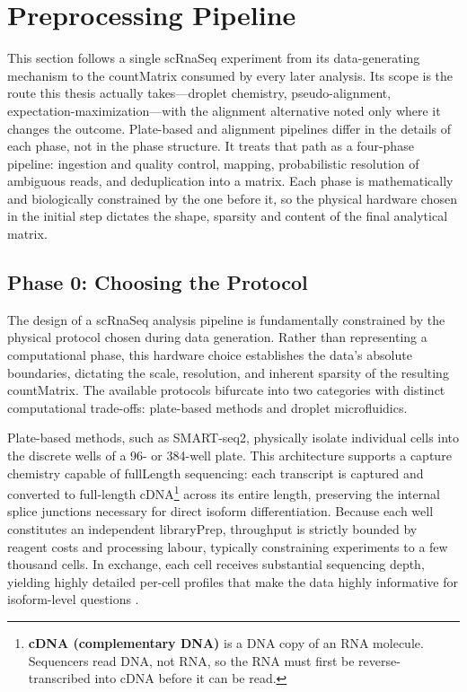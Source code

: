 \section{Preprocessing Pipeline}

This section follows a single \gls{scRnaSeq} experiment from its data-generating mechanism to the \gls{countMatrix} consumed by every later analysis. Its scope is the route this thesis actually takes---droplet chemistry, pseudo-alignment, expectation-maximization---with the alignment alternative noted only where it changes the outcome. Plate-based and alignment pipelines differ in the details of each phase, not in the phase structure. It treats that path as a four-phase pipeline: ingestion and quality control, mapping, probabilistic resolution of ambiguous reads, and deduplication into a matrix. Each phase is mathematically and biologically constrained by the one before it, so the physical hardware chosen in the initial step dictates the shape, \gls{sparsity} and content of the final analytical matrix.

\subsection{Phase 0: Choosing the Protocol}

The design of a \gls{scRnaSeq} analysis pipeline is fundamentally constrained by the physical protocol chosen during data generation. Rather than representing a computational phase, this hardware choice establishes the data's absolute boundaries, dictating the scale, resolution, and inherent \gls{sparsity} of the resulting \gls{countMatrix}. The available protocols bifurcate into two categories with distinct computational trade-offs: plate-based methods and droplet microfluidics.

Plate-based methods, such as SMART-seq2, physically isolate individual cells into the discrete wells of a 96- or 384-well plate. This architecture supports a capture chemistry capable of \gls{fullLength} sequencing: each transcript is captured and converted to full-length cDNA\footnote{\textbf{cDNA (complementary DNA)} is a DNA copy of an RNA molecule. Sequencers read DNA, not RNA, so the RNA must first be reverse-transcribed into cDNA before it can be read.} across its entire length, preserving the internal splice junctions necessary for direct isoform differentiation. Because each well constitutes an independent \gls{libraryPrep}, throughput is strictly bounded by reagent costs and processing labour, typically constraining experiments to a few thousand cells. In exchange, each cell receives substantial sequencing depth, yielding highly detailed per-cell profiles that make the data highly informative for isoform-level questions \cite{conte2024opportunities}.

